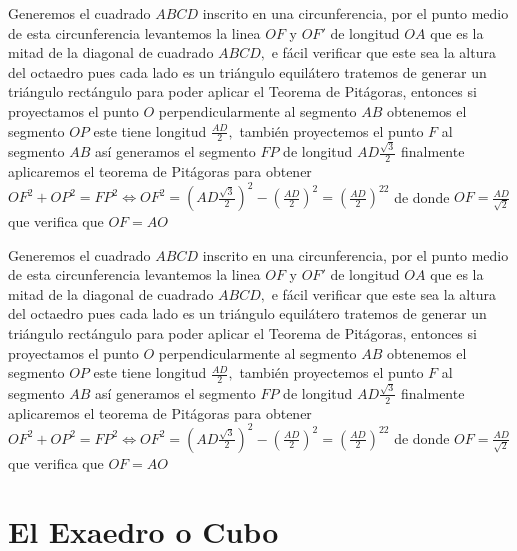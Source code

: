 \documentclass[a4paper]{book}
\newcommand{\pa}[1]{\left(#1\right)}
\begin{document}
Generemos el cuadrado  $ABCD$ inscrito en una circunferencia, por el punto medio de esta circunferencia levantemos la linea $OF$ y $OF'$ de longitud $OA$ que es la mitad de la diagonal de cuadrado $ABCD,$ e fácil verificar que este sea la altura del octaedro pues cada lado es un triángulo equilátero tratemos de generar un triángulo rectángulo para poder aplicar el Teorema de Pitágoras, entonces si proyectamos el punto $O$ perpendicularmente al  segmento $AB$ obtenemos el segmento $OP$ este tiene longitud $\frac{AD}{2},$ también proyectemos el punto $F$ al segmento $AB$ así generamos el segmento $FP$ de longitud $AD\frac{\sqrt{3}}{2}$ finalmente aplicaremos el teorema de Pitágoras para obtener $OF^2+OP^2=FP^2\Longleftrightarrow OF^2=\pa{AD\frac{\sqrt{3}}{2}}^2-\pa{\frac{AD}{2}}^2
=\pa{\frac{AD}{2}}^22$ de donde $OF=\frac{AD}{\sqrt{2}}$ que verifica que $OF=AO$


Generemos el cuadrado  $ABCD$ inscrito en una circunferencia, por el punto medio de esta circunferencia levantemos la linea $OF$ y $OF'$ de longitud $OA$ que es la mitad de la diagonal de cuadrado $ABCD,$ e fácil verificar que este sea la altura del octaedro pues cada lado es un triángulo equilátero tratemos de generar un triángulo rectángulo para poder aplicar el Teorema de Pitágoras, entonces si proyectamos el punto $O$ perpendicularmente al  segmento $AB$ obtenemos el segmento $OP$ este tiene longitud $\frac{AD}{2},$ también proyectemos el punto $F$ al segmento $AB$ así generamos el segmento $FP$ de longitud $AD\frac{\sqrt{3}}{2}$ finalmente aplicaremos el teorema de Pitágoras para obtener $OF^2+OP^2=FP^2\Longleftrightarrow OF^2=\pa{AD\frac{\sqrt{3}}{2}}^2-\pa{\frac{AD}{2}}^2
=\pa{\frac{AD}{2}}^22$ de donde $OF=\frac{AD}{\sqrt{2}}$ que verifica que $OF=AO$



\section{El Exaedro o Cubo}
\end{document}

